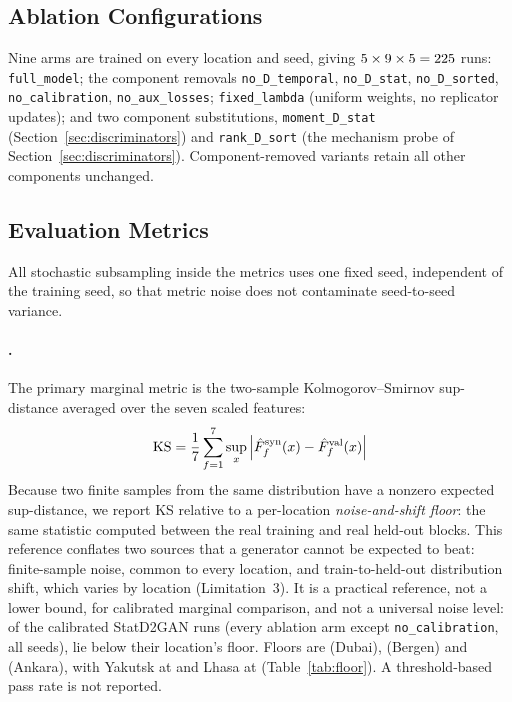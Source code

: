 \documentclass[preprint,12pt]{elsarticle}
\makeatletter
\let\ElsParagraph\paragraph
\def\StripRunInStop#1.\StripRunInMark#2\StripRunInEnd{#1}
\let\StripRunInMark\@empty
\renewcommand\paragraph[1]{\ElsParagraph{\StripRunInStop#1\StripRunInMark.\StripRunInMark\StripRunInEnd}}
\newcommand{\abs}[1]{\left| #1 \right|}
\makeatother
\begin{document}
\subsection{Ablation Configurations}
\label{sec:ablations}

Nine arms are trained on every location and seed, giving
$5 \times 9 \times 5 = 225$ runs:
\texttt{full\_model};
the component removals \texttt{no\_D\_temporal}, \texttt{no\_D\_stat},
\texttt{no\_D\_sorted}, \texttt{no\_calibration},
\texttt{no\_aux\_losses};
\texttt{fixed\_lambda} (uniform weights, no replicator updates); and
two component substitutions, \texttt{moment\_D\_stat}
(Section~\ref{sec:discriminators}) and \texttt{rank\_D\_sort}
(the mechanism probe of Section~\ref{sec:discriminators}).
Component-removed variants retain all other components unchanged.

\subsection{Evaluation Metrics}
\label{sec:metrics}

All stochastic subsampling inside the metrics uses one fixed seed,
independent of the training seed, so that metric noise does not
contaminate seed-to-seed variance.

\paragraph{KS sup-distance against a noise-and-shift floor $\downarrow$.}
The primary marginal metric is the two-sample Kolmogorov--Smirnov
sup-distance averaged over the seven scaled features:
\begin{equation}
  \mathrm{KS}
    = \frac{1}{\protoNScaled}\sum_{f=1}^{\protoNScaled}
      \sup_x \abs{\hat{F}_f^{\mathrm{syn}}(x) - \hat{F}_f^{\mathrm{val}}(x)}
  \label{eq:ks}
\end{equation}
Because two finite samples from the same distribution have a nonzero
expected sup-distance, we report KS relative to a per-location
\emph{noise-and-shift floor}: the same statistic computed between the real
training and real held-out blocks. This reference conflates two sources
that a generator cannot be expected to beat: finite-sample noise, common
to every location, and train-to-held-out distribution shift, which
varies by location (Limitation~3). It is a practical reference, not a lower bound,
for calibrated marginal comparison, and not a universal noise level: of
the \phKsRatioCells{} calibrated StatD2GAN runs (every ablation arm except
\texttt{no\_calibration}, all seeds), \phKsRatioCellsBelowOne{} lie below
their location's floor.
Floors are \ksFloorDubai{} (Dubai), \ksFloorBergen{} (Bergen) and
\ksFloorAnkara{} (Ankara), with Yakutsk at \ksFloorYakutsk{} and Lhasa at
\ksFloorLhasa{}
(Table~\ref{tab:floor}).  A threshold-based pass rate is not reported.
\end{document}
